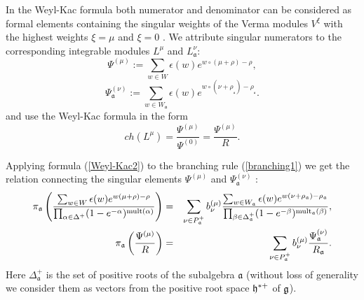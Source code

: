 \documentclass[12pt]{iopart}
\theoremstyle{definition}
\newcommand{\af}{\mathfrak{a}}
\begin{document}
In the Weyl-Kac formula both numerator and denominator  can be considered
as formal elements containing the singular weights of the Verma modules $V^{\xi}$
with the highest weights $\xi=\mu$ and $\xi=0$ \cite{humphreys1997introduction}.
We attribute singular numerators to the corresponding integrable modules $L^{\mu }$
and $L_{\af}^{\nu }$:
\begin{equation*}
\Psi ^{\left( \mu \right) }:=\sum\limits_{w\in W}\epsilon (w)e^{w\circ (\mu +\rho )-\rho },
\end{equation*}
\begin{equation*}
\Psi _{ \af}^{\left( \nu \right) }:=
\sum\limits_{w\in W_{\af}}\epsilon (w)e^{w\circ (\nu +\rho
_{_{\af}})-\rho _{_{\af}}}.
\end{equation*}
and use the Weyl-Kac formula in the form
\begin{equation}
\label{Weyl-Kac2}
ch\left( L^{\mu }\right) =\frac{\Psi ^{\left( \mu \right) }}
{\Psi ^{\left( 0 \right) }}=\frac{\Psi ^{\left( \mu \right) }}{R}.
\end{equation}

Applying formula (\ref{Weyl-Kac2}) to the branching rule (\ref{branching1})
we get the relation connecting the
singular elements $\Psi ^{\left( \mu \right) }$ and $\Psi _{ \af}^{\left( \nu \right) }$ :
\begin{eqnarray}
\nonumber
\pi _{\af}\left( \frac{\sum_{w \in W}\epsilon (w )e^{w
(\mu +\rho )-\rho }}{\prod_{\alpha \in \Delta ^{+}}(1-e^{-\alpha })^{\mathrm{%
mult}(\alpha )}}\right) &=&\sum_{\nu \in P_{\af}^{+}}b_{\nu }^{(\mu )}%
\frac{\sum_{w \in W_{\af}}\epsilon (w )e^{w (\nu +\rho _{%
\af})-\rho _{\af}}}{\prod_{\beta \in \Delta _{\af%
}^{+}}(1-e^{-\beta })^{\mathrm{mult}_{\af}(\beta )}},  \label{eq:4} \\
\pi _{\af}\left( \frac{\Psi ^{\left( \mu \right) }}{R}\right)
&=&\sum_{\nu \in P_{\af}^{+}}b_{\nu }^{(\mu )}\frac{\Psi _{ \frak{%
a}}^{\left( \nu \right) }}{R_{\af}}.
\end{eqnarray}
Here $\Delta _{\af}^{+}$ is the set of
positive roots of the subalgebra $\af$ (without loss of generality we consider
them as vectors from the positive root space $\frak{h}^{\ast  +}$ of $\frak{g}$).
\end{document}
